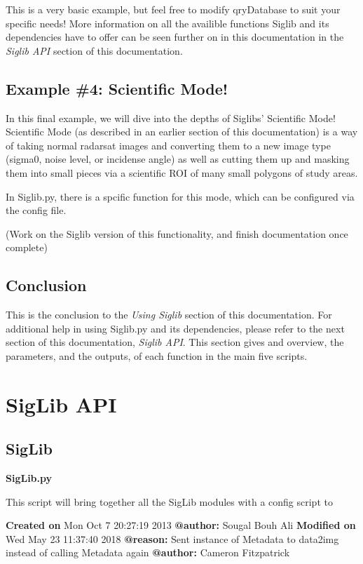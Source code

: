 \documentclass[letterpaper,10pt,openany,oneside]{sphinxmanual}
\begin{document}
This is a very basic example, but feel free to modify qryDatabase to suit your
specific needs! More information on all the availible functions Siglib and its
dependencies have to offer can be seen further on in this documentation in the
\emph{Siglib API} section of this documentation.


\section{Example \#4: Scientific Mode!}
\label{tutorial:example-4-scientific-mode}
In this final example, we will dive into the depths of Siglibs' Scientific Mode!
Scientific Mode (as described in an earlier section of this documentation) is a way of
taking normal radarsat images and converting them to a new image type (sigma0,
noise level, or incidense angle) as well as cutting them up and masking them into small
pieces via a scientific ROI of many small polygons of study areas.

In Siglib.py, there is a spcific function for this mode, which can be configured
via the config file.

(Work on the Siglib version of this functionality, and finish documentation once complete)


\section{Conclusion}
\label{tutorial:conclusion}
This is the conclusion to the \emph{Using Siglib} section of this documentation. For
additional help in using Siglib.py and its dependencies, please refer to the next section
of this documentation, \emph{Siglib API}. This section gives and overview, the parameters,
and the outputs, of each function in the main five scripts.


\chapter{SigLib API}
\label{code:siglib-api}\label{code::doc}

\section{SigLib}
\label{code:module-SigLib}\label{code:siglib}
\textbf{SigLib.py}

This script will bring together all the SigLib modules with a config script to

\textbf{Created on} Mon Oct  7 20:27:19 2013 \textbf{@author:} Sougal Bouh Ali
\textbf{Modified on} Wed May  23 11:37:40 2018 \textbf{@reason:} Sent instance of Metadata to data2img instead of calling Metadata again \textbf{@author:} Cameron Fitzpatrick
\end{document}
